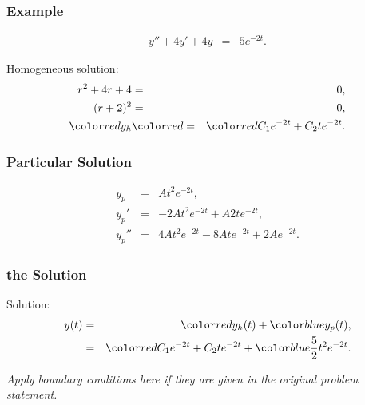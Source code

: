 \begin{frame}
  \frametitle{Example}

  \begin{eqnarray*}
    y'' + 4y' + 4y & = & 5 e^{-2t}.
  \end{eqnarray*}

  {
    Homogeneous solution:
    \begin{eqnarray*}
      r^2 + 4r + 4 & = & 0, \\
      (r+2)^2 & = & 0, \\
      \redText{y_h} & \redText{=} & \redText{C_1 e^{-2t} + C_2 t e^{-2t}}.
    \end{eqnarray*}
  }

\end{frame}

\begin{frame}
  \frametitle{Particular Solution}
  
  \begin{eqnarray*}
    y_p & = & A t^2 e^{-2t}, \\
    y_p' & = & -2 A t^2 e^{-2t} + A 2t e^{-2t}, \\
    y_p'' & = & 4 A t^2 e^{-2t} - 8A t e^{-2t} + 2 A e^{-2t}.      
  \end{eqnarray*}



\end{frame}


\begin{frame}
  \frametitle{the Solution}
  Solution:
  \begin{eqnarray*}
    y(t) & = & \redText{y_h(t)} + \blueText{y_p(t)}, \\
         & = & \redText{C_1 e^{-2t} + C_2 t e^{-2 t}} + \blueText{\frac{5}{2} t^2 e^{-2t}}.
  \end{eqnarray*}

  \textit{Apply boundary conditions here if they are given in the original problem statement.}

\end{frame}


